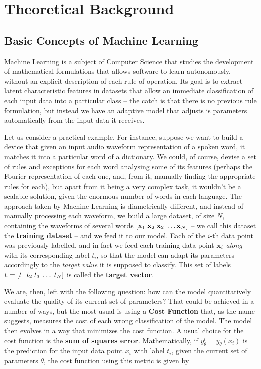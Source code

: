 \chapter{Theoretical Background}\label{chap:theorBack}


\section{Basic Concepts of Machine Learning}
Machine Learning is a subject of Computer Science that studies the development of mathematical formulations that allows software to learn autonomously, without an explicit description of each rule of operation. Its goal is to extract latent characteristic features in datasets that allow an immediate classification of each input data into a particular class -- the catch is that there is no previous rule formulation, but instead we have an adaptive model that adjusts is parameters automatically from the input data it receives. 

Let us consider a practical example. For instance, suppose we want to build a device that given an input audio waveform representation of a spoken word, it matches it into a particular word of a dictionary. We could, of course, devise a set of rules and exceptions for each word analysing some of its features (perhaps the Fourier representation of each one, and, from it, manually finding the appropriate rules for each), but apart from it being a very complex task, it wouldn't be a scalable solution, given the enormous number of words in each language. The approach taken by Machine Learning is diametrically different, and instead of manually processing each waveform, we build a large dataset, of size $N$, containing the waveforms of several words $\left[ \mathbf{x}_1 \; \mathbf{x}_2 \;\mathbf{x}_2 \; \dots \mathbf{x}_N \right]$ -- we call this dataset the \textbf{training dataset} -- and we feed it to our model. Each of the $i$-th data point was previously labelled, and in fact we feed each training data point $\mathbf{x}_i$ \emph{along} with its corresponding label $t_i$, so that the model can adapt its parameters accordingly to the \emph{target value} it is supposed to classify. This set of labels $\mathbf{t} = \left[ t_1 \; t_2 \; t_3 \; \dots \; t_N \right]$ is called the \textbf{target vector}. 

We are, then, left with the following question: how can the model quantitatively evaluate the quality of its current set of parameters? That could be achieved in a number of ways, but the most usual is using a \textbf{Cost Function} that, as the name suggests, measures the cost of each wrong classification of the model. The model then evolves in a way that minimizes the cost function. A usual choice for the cost function is the \textbf{sum of squares error}. Mathematically, if $y_{\theta}^i = y_{\theta}(x_i)$ is the prediction for the input data point $x_i$ with label $t_i$, given the current set of parameters $\theta$, the cost function using this metric is given by

